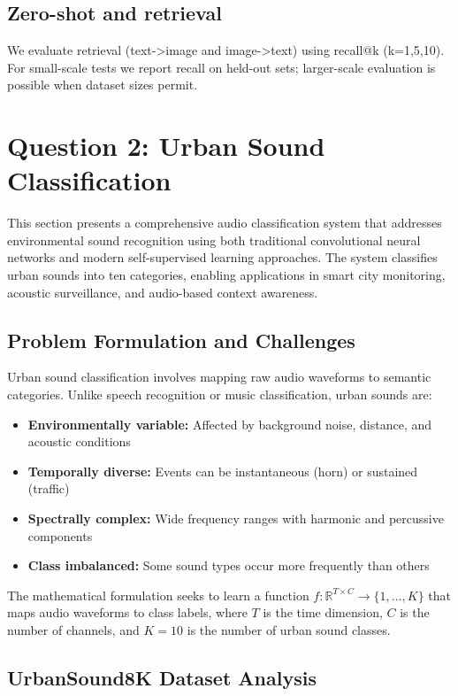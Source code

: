 \documentclass[conference]{IEEEtran}
\begin{document}
\subsection{Zero-shot and retrieval}
We evaluate retrieval (text->image and image->text) using recall@k (k=1,5,10). For small-scale tests we report recall on held-out sets; larger-scale evaluation is possible when dataset sizes permit.

\section{Question 2: Urban Sound Classification}
\label{sec:q2}

This section presents a comprehensive audio classification system that addresses environmental sound recognition using both traditional convolutional neural networks and modern self-supervised learning approaches. The system classifies urban sounds into ten categories, enabling applications in smart city monitoring, acoustic surveillance, and audio-based context awareness.

\subsection{Problem Formulation and Challenges}
\label{sec:q2_problem}

Urban sound classification involves mapping raw audio waveforms to semantic categories. Unlike speech recognition or music classification, urban sounds are:
\begin{itemize}
  \item \textbf{Environmentally variable:} Affected by background noise, distance, and acoustic conditions
  \item \textbf{Temporally diverse:} Events can be instantaneous (horn) or sustained (traffic)
  \item \textbf{Spectrally complex:} Wide frequency ranges with harmonic and percussive components
  \item \textbf{Class imbalanced:} Some sound types occur more frequently than others
\end{itemize}

The mathematical formulation seeks to learn a function $f: \mathbb{R}^{T \times C} \to \{1, \dots, K\}$ that maps audio waveforms to class labels, where $T$ is the time dimension, $C$ is the number of channels, and $K=10$ is the number of urban sound classes.

\subsection{UrbanSound8K Dataset Analysis}
\label{sec:q2_dataset}
\end{document}
